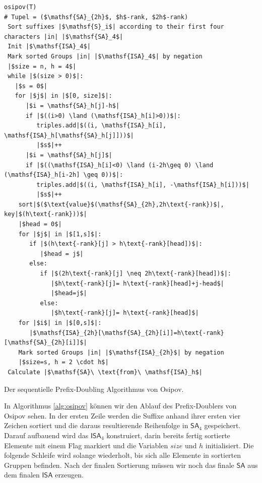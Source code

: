 \begin{listing}
\begin{verbatim}
osipov(T)
# Tupel = ($\mathsf{SA}_{2h}$, $h$-rank, $2h$-rank)
 Sort suffixes |$\mathsf{S}_i$| according to their first four characters |in| |$\mathsf{SA}_4$| 
 Init |$\mathsf{ISA}_4$| 
 Mark sorted Groups |in| |$\mathsf{ISA}_4$| by negation
 |$size = n, h = 4$| 
 while |$(size > 0)$|:  
   |$s = 0$|
   for |$j$| in |$[0, size]$|:
      |$i = \mathsf{SA}_h[j]-h$|
      if |$((i>0) \land (\mathsf{ISA}_h[i]>0))$|:
         triples.add|$((i, \mathsf{ISA}_h[i], \mathsf{ISA}_h[\mathsf{SA}_h[j]]))$|
         |$s$|++
      |$i = \mathsf{SA}_h[j]$|
      if |$((\mathsf{ISA}_h[i]<0) \land (i-2h\geq 0) \land (\mathsf{ISA}_h[i-2h] \geq 0))$|:
         triples.add|$((i, \mathsf{ISA}_h[i], -\mathsf{ISA}_h[i]))$|
         |$s$|++
    sort|$($\text{value}$(\mathsf{SA}_{2h},2h\text{-rank})$|, key|$(h\text{-rank}))$|
    |$head = 0$|
    for |$j$| in |$[1,s]$|:
       if |$(h\text{-rank}[j] > h\text{-rank}[head])$|:
          |$head = j$|
       else:
          if |$(2h\text{-rank}[j] \neq 2h\text{-rank}[head])$|:
             |$h\text{-rank}[j]= h\text{-rank}[head]+j-head$|
             |$head=j$|
          else:
             |$h\text{-rank}[j]= h\text{-rank}[head]$|
    for |$i$| in |$[0,s]$|:
       |$\mathsf{ISA}_{2h}[\mathsf{SA}_{2h}[i]]=h\text{-rank}[\mathsf{SA}_{2h}[i]]$|
    Mark sorted Groups |in| |$\mathsf{ISA}_{2h}$| by negation
    |$size=s, h = 2 \cdot h$| 
 Calculate |$\mathsf{SA}\ \text{from}\ \mathsf{ISA}_h$|
\end{verbatim}
\caption{Der sequentielle Prefix-Doubling Algorithmus von Osipov.}
\label{alg:osipov}
\end{listing}

In Algorithmus \ref{alg:osipov} können wir den Ablauf des Prefix-Doublers von Osipov sehen. In der ersten Zeile werden die Suffixe anhand ihrer ersten vier Zeichen sortiert und die daraus resultierende Reihenfolge in $\mathsf{SA}_4$ gespeichert. Darauf aufbauend wird das $\mathsf{ISA}_4$ konstruiert, darin bereits fertig sortierte Elemente mit einem Flag markiert und die Variablen $size$ und $h$ initialisiert. Die folgende Schleife wird solange wiederholt, bis sich alle Elemente in sortierten Gruppen befinden. Nach der finalen Sortierung müssen wir noch das finale $\mathsf{SA}$ aus dem finalen $\mathsf{ISA}$ erzeugen.

